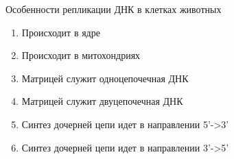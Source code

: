 
Особенности репликации ДНК в
клетках животных

\begin{enumerate}
    \item Происходит в ядре 
    \item Происходит в митохондриях 
    \item Матрицей служит одноцепочечная ДНК 
    \item Матрицей служит двуцепочечная ДНК 
    \item Синтез дочерней цепи идет в направлении 5’->3’
    \item Синтез дочерней цепи идет в направлении 3’->5’
\end{enumerate}





